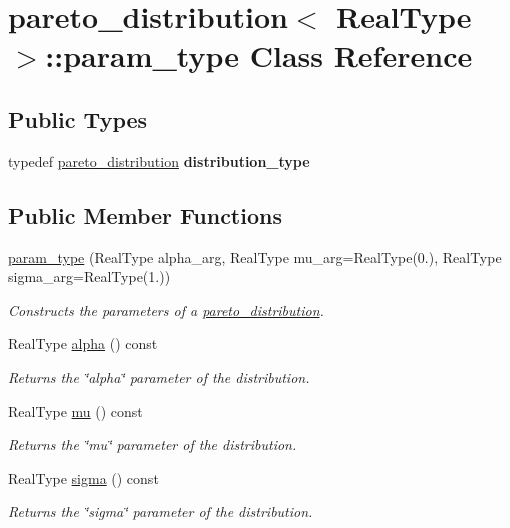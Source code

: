 \hypertarget{classpareto__distribution_1_1param__type}{}\section{pareto\+\_\+distribution$<$ Real\+Type $>$\+:\+:param\+\_\+type Class Reference}
\label{classpareto__distribution_1_1param__type}
\subsection*{Public Types}
\begin{DoxyCompactItemize}
\item 
\mbox{\label{classpareto__distribution_1_1param__type_af53442713386a26de11f21594ee1a495}} 
typedef \mbox{\hyperlink{classpareto__distribution}{pareto\+\_\+distribution}} {\bfseries distribution\+\_\+type}
\end{DoxyCompactItemize}
\subsection*{Public Member Functions}
\begin{DoxyCompactItemize}
\item 
\mbox{\hyperlink{classpareto__distribution_1_1param__type_ad7baf0b5bbef69d2ffe204e40c6db9dc}{param\+\_\+type}} (Real\+Type alpha\+\_\+arg, Real\+Type mu\+\_\+arg=Real\+Type(0.), Real\+Type sigma\+\_\+arg=Real\+Type(1.))
\begin{DoxyCompactList}\small\item\em Constructs the parameters of a \mbox{\hyperlink{classpareto__distribution}{pareto\+\_\+distribution}}. \end{DoxyCompactList}\item 
Real\+Type \mbox{\hyperlink{classpareto__distribution_1_1param__type_a17ac0145e5c5ba8d7b1d30686f04a8c9}{alpha}} () const
\begin{DoxyCompactList}\small\item\em Returns the \char`\"{}alpha\char`\"{} parameter of the distribution. \end{DoxyCompactList}\item 
Real\+Type \mbox{\hyperlink{classpareto__distribution_1_1param__type_a04e73cd088de22acbf0f89fdc64ffac3}{mu}} () const
\begin{DoxyCompactList}\small\item\em Returns the \char`\"{}mu\char`\"{} parameter of the distribution. \end{DoxyCompactList}\item 
Real\+Type \mbox{\hyperlink{classpareto__distribution_1_1param__type_ac115308c4703af0f20c0e3dba77ae3cb}{sigma}} () const
\begin{DoxyCompactList}\small\item\em Returns the \char`\"{}sigma\char`\"{} parameter of the distribution. \end{DoxyCompactList}\end{DoxyCompactItemize}
